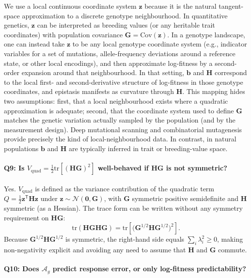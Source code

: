 \documentclass[9pt,twocolumn,twoside,lineno]{gsajnl}
\newcommand{\vect}[1]{\boldsymbol{#1}}
\newcommand{\mat}[1]{\mathbf{#1}}
\newcommand{\Ag}{\ensuremath{\mathcal{A}_{g}}\xspace}
\begin{document}
We use a local continuous coordinate system $\vect{z}$ because it is the natural tangent-space approximation to a discrete genotype neighbourhood. In quantitative genetics, $\vect{z}$ can be interpreted as breeding values (or any heritable trait coordinates) with population covariance $\mat{G}=\mathrm{Cov}(\vect{z})$. In a genotype landscape, one can instead take $\vect{z}$ to be any local genotype coordinate system (e.g., indicator variables for a set of mutations, allele-frequency deviations around a reference state, or other local encodings), and then approximate log-fitness by a second-order expansion around that neighbourhood. In that setting, $\vect{b}$ and $\mat{H}$ correspond to the local first- and second-derivative structure of log-fitness in those genotype coordinates, and epistasis manifests as curvature through $\mat{H}$. This mapping hides two assumptions: first, that a local neighbourhood exists where a quadratic approximation is adequate; second, that the coordinate system used to define $\mat{G}$ matches the genetic variation actually sampled by the population (and by the measurement design). Deep mutational scanning and combinatorial mutagenesis provide precisely the kind of local-neighbourhood data. In contrast, in natural populations $\vect{b}$ and $\mat{H}$ are typically inferred in trait or breeding-value space.

\paragraph{Q9: Is $V_{\mathrm{quad}}=\tfrac{1}{2}\mathrm{tr}\!\left[(\mat{H}\mat{G})^{2}\right]$ well-behaved if $\mat{H}\mat{G}$ is not symmetric?}

Yes. $V_{\mathrm{quad}}$ is defined as the variance contribution of the quadratic term $Q=\tfrac{1}{2}\vect{z}^{\mathsf{T}}\mat{H}\vect{z}$ under $\vect{z}\sim\mathcal{N}(\vect{0},\mat{G})$, with $\mat{G}$ symmetric positive semidefinite and $\mat{H}$ symmetric (as a Hessian). The trace form can be written without any symmetry requirement on $\mat{H}\mat{G}$:
\[
\mathrm{tr}(\mat{H}\mat{G}\mat{H}\mat{G})
=
\mathrm{tr}\!\left[\big(\mat{G}^{1/2}\mat{H}\mat{G}^{1/2}\big)^2\right].
\]
Because $\mat{G}^{1/2}\mat{H}\mat{G}^{1/2}$ is symmetric, the right-hand side equals $\sum_i \lambda_i^2\ge 0$, making non-negativity explicit and avoiding any need to assume that $\mat{H}$ and $\mat{G}$ commute.

\paragraph{Q10: Does $\Ag$ predict response error, or only log-fitness predictability?}
\end{document}
